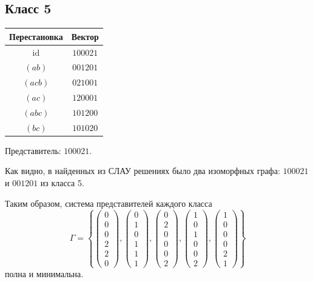 \documentclass[12pt,a4paper]{article}
\newcommand{\col}[1]{\begin{pmatrix}#1\end{pmatrix}}
\begin{document}
\subsection*{Класс 5}
\begin{center}
\begin{minipage}{.46\textwidth}
\centering
\begin{tabular}{cc}
Перестановка & Вектор\\\hline
$\mathrm{id}$ & $100021$\\
$(ab)$ & $001201$\\
$(acb)$ & $021001$\\
$(ac)$ & $120001$\\
$(abc)$ & $101200$\\
$(bc)$ & $101020$
\end{tabular}
\end{minipage}\hfill
\begin{minipage}{.46\textwidth}
\centering
Представитель: $100021$.

\end{minipage}
\end{center}
Как видно, в найденных из СЛАУ решениях было два изоморфных графа:
$100021$ и $001201$ из класса 5.

Таким образом, система представителей каждого класса
\[
\Gamma=\left\{
\col{0\\0\\0\\2\\2\\0},
\col{0\\1\\0\\1\\1\\1},
\col{0\\2\\0\\0\\0\\2},
\col{1\\0\\1\\0\\0\\2},
\col{1\\0\\0\\0\\2\\1}
\right\}
\]
полна и минимальна.
\end{document}
